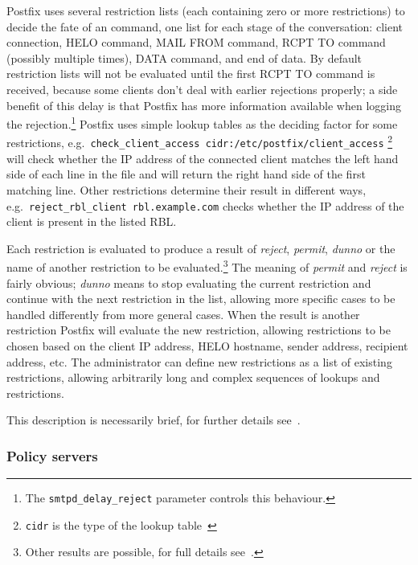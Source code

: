 \documentclass[a4paper,12pt,draft]{article}
\begin{document}
Postfix uses several restriction lists (each containing zero or more
restrictions) to decide the fate of an \SMTP{} command, one list for each
stage of the \SMTP{} conversation: client connection, HELO command, MAIL
FROM command, RCPT TO command (possibly multiple times), DATA command, and
end of data.  By default restriction lists will not be evaluated until the
first RCPT TO command is received, because some clients don't deal with
earlier rejections properly; a side benefit of this delay is that Postfix
has more information available when logging the rejection.\footnote{The
\texttt{smtpd\_delay\_reject} parameter controls this behaviour.}  Postfix
uses simple lookup tables as the deciding factor for some restrictions,
e.g.\ \texttt{check\_client\_access~cidr:/etc/postfix/client\_access}
\footnote{\texttt{cidr} is the type of the lookup table~\cite{cidr_table}}
will check whether the IP address of the connected client matches the left
hand side of each line in the file and will return the right hand side of
the first matching line.  Other restrictions determine their result in
different ways, e.g.\ \texttt{reject\_rbl\_client rbl.example.com} checks
whether the IP address of the client is present in the listed RBL\@.

Each restriction is evaluated to produce a result of \textit{reject},
\textit{permit}, \textit{dunno\/} or the name of another restriction to be
evaluated.\footnote{Other results are possible, for full details
see~\cite{smtpd_access_readme, smtpd_per_user_control, policy-servers}.}
The meaning of \textit{permit\/} and \textit{reject\/} is fairly obvious;
\textit{dunno\/} means to stop evaluating the current restriction and
continue with the next restriction in the list, allowing more specific
cases to be handled differently from more general cases.  When the result
is another restriction Postfix will evaluate the new restriction, allowing
restrictions to be chosen based on the client IP address, HELO hostname,
sender address, recipient address, etc.  The administrator can define new
restrictions as a list of existing restrictions, allowing arbitrarily long
and complex sequences of lookups and restrictions.

This description is necessarily brief, for further details
see~\cite{smtpd_access_readme, smtpd_per_user_control, policy-servers}.


\subsubsection{Policy servers}
\end{document}
